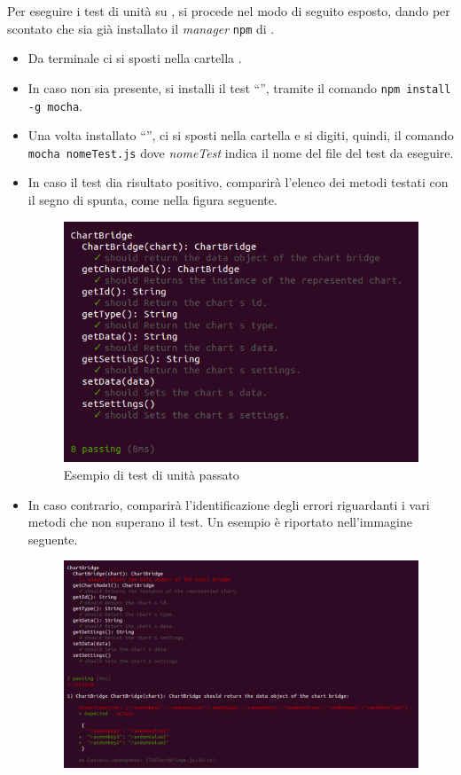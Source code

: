 					Per eseguire i test di unità su , si procede nel modo di seguito esposto, dando per scontato che sia già installato il \textit{ manager} \texttt{npm} di .
					\begin{itemize}
						\item Da terminale ci si sposti nella cartella .
						\item In caso non sia presente, si installi il test  “”, tramite il comando \texttt{npm install -g mocha}. 
						\item Una volta installato “”, ci si sposti nella cartella  e si digiti, quindi, il comando \texttt{mocha nomeTest.js} dove \textit{nomeTest} indica il nome del file del test da eseguire. 
						\item In caso il test dia risultato positivo, comparirà l'elenco dei metodi testati con il segno di spunta, come nella figura seguente.
						\begin{figure}[H]
							\centering
							\includegraphics[scale=0.5]{Pics/TUpassing.png}
							\caption{Esempio di test di unità passato}
						\end{figure}
						\item In caso contrario, comparirà l'identificazione degli errori riguardanti i vari metodi che non superano il test. Un esempio è riportato nell'immagine seguente.
						\begin{figure}[H]
							\centering
							\includegraphics[scale=0.4]{Pics/TUnotPassing.png}

\end{figure}
\end{itemize}
